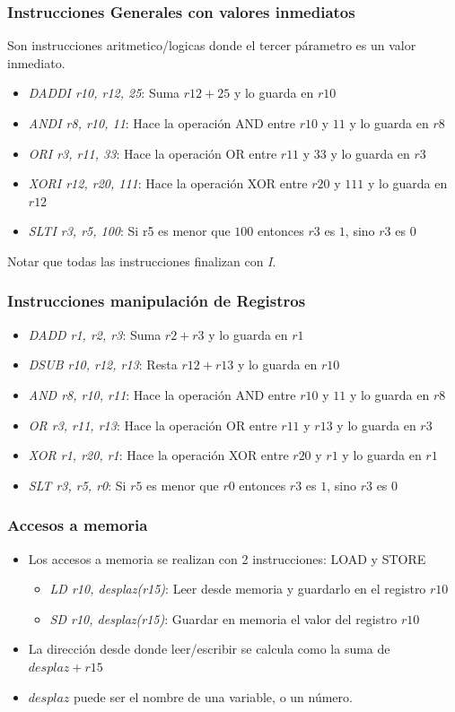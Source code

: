 \documentclass{beamer}
\begin{document}
\begin{frame}
\frametitle{Instrucciones Generales con valores inmediatos}
Son instrucciones aritmetico/logicas donde el tercer párametro es un valor inmediato.
\begin{itemize}
\item \emph{DADDI r10, r12, 25}: Suma $r12 + 25$ y lo guarda en $r10$
\item \emph{ANDI r8, r10, 11}: Hace la operación AND entre  $r10$ y $11$ y lo guarda en $r8$
\item \emph{ORI r3, r11, 33}: Hace la operación OR entre  $r11$ y $33$ y lo guarda en $r3$
\item \emph{XORI r12, r20, 111}: Hace la operación XOR entre  $r20$ y $111$ y lo guarda en $r12$
\item \emph{SLTI r3, r5, 100}: Si r5 es menor que $100$ entonces $r3$ es $1$, sino $r3$ es $0$
\end{itemize}
Notar que todas las instrucciones finalizan con \emph{I}.
\end{frame}

\begin{frame}
\frametitle{Instrucciones manipulación de Registros}
\begin{itemize}
\item \emph{DADD r1, r2, r3}: Suma $r2 + r3$ y lo guarda en $r1$
\item \emph{DSUB r10, r12, r13}: Resta $r12 + r13$ y lo guarda en $r10$
\item \emph{AND r8, r10, r11}: Hace la operación AND entre  $r10$ y $11$ y lo guarda en $r8$
\item \emph{OR r3, r11, r13}: Hace la operación OR entre  $r11$ y $r13$ y lo guarda en $r3$
\item \emph{XOR r1, r20, r1}: Hace la operación XOR entre  $r20$ y $r1$ y lo guarda en $r1$
\item \emph{SLT r3, r5, r0}: Si $r5$ es menor que $r0$ entonces $r3$ es $1$, sino $r3$ es $0$
\end{itemize}
\end{frame}

\begin{frame}[fragile]
\frametitle{Accesos a memoria}
\begin{itemize}
\item Los accesos a memoria se realizan con 2 instrucciones: LOAD y STORE
\begin{itemize}
\item \emph{LD r10, desplaz(r15)}: Leer desde memoria y guardarlo en el registro $r10$
\item \emph{SD r10, desplaz(r15)}: Guardar en memoria el valor del registro $r10$
\end{itemize}
\item La dirección desde donde leer/escribir se calcula como la suma de $desplaz + r15$
\item $desplaz$ puede ser el nombre de una variable, o un número.
\end{itemize}
\end{frame}
\end{document}
